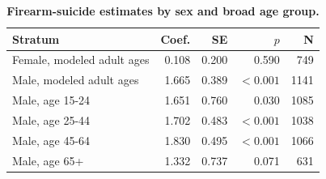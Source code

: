 \begin{table}[H]
\centering
\caption{\textbf{Firearm-suicide estimates by sex and broad age group.}}
\label{tab:sex_age}
\begin{tabular}{lrrrr}
\toprule
Stratum & Coef. & SE & $p$ & N \\
\midrule
Female, modeled adult ages & 0.108 & 0.200 & 0.590 & 749 \\
Male, modeled adult ages & 1.665 & 0.389 & $<0.001$ & 1141 \\
Male, age 15-24 & 1.651 & 0.760 & 0.030 & 1085 \\
Male, age 25-44 & 1.702 & 0.483 & $<0.001$ & 1038 \\
Male, age 45-64 & 1.830 & 0.495 & $<0.001$ & 1066 \\
Male, age 65+ & 1.332 & 0.737 & 0.071 & 631 \\
\bottomrule
\end{tabular}
\end{table}

